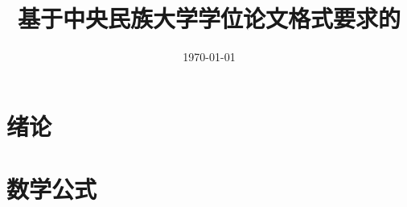 \documentclass[a4paper,openany]{ctexbook}
\title{基于中央民族大学学位论文格式要求的\LaTeX模板}
\author{\kaishu{民大某学生}}
\date{\today}
\newcommand{\enabstractname}{Abstract}
\newcommand{\cnabstractname}{摘~要}
\newenvironment{enabstract}{%
  \par\small
  \noindent\mbox{}\hfill{\bfseries \zihao{3} \enabstractname}\hfill\mbox{}\par
  \vskip 32bp}{\par\vskip 2.5ex}
\newenvironment{cnabstract}{%
  \par\small
  \noindent\mbox{}\hfill{\heiti \zihao{3} \cnabstractname}\hfill\mbox{}\par
  \vskip 32bp}{\par\vskip 2.5ex}
\begin{document}
    \begin{titlepage}
        
    \end{titlepage}


    \pagestyle{plain}


    
    
    


    \tableofcontents

    \renewcommand{\listfigurename}{插图目录}
    \listoffigures

    \renewcommand{\listtablename}{表格目录}
    \listoftables


    \chapter{绪论}
    \setcounter{page}{1}
    


    \chapter{数学公式}
    
\end{document}

